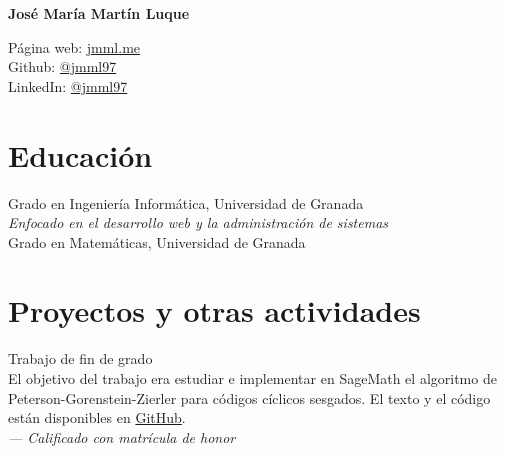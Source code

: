 \documentclass[11pt]{article} %
\begin{document}
\pagestyle{fancy}


{\LARGE\bfseries José María Martín Luque}
\bigskip\bigskip\medskip

\ifdefined\emailphone
  
\fi
Página web: \href{https://jmml.me}{jmml.me}\\
Github: \href{https://github.com/jmml97}{@jmml97}\\
LinkedIn: \href{https://linkedin.com/in/jmml97}{@jmml97}\\


\section*{Educación}

 Grado en Ingeniería Informática, Universidad de Granada\\
	{\color{gray}\itshape Enfocado en el desarrollo web y la administración de sistemas}\\

 Grado en Matemáticas, Universidad de Granada\\



\section*{Proyectos y otras actividades}

 Trabajo de fin de grado\\
{\color{gray}El objetivo del trabajo era estudiar e implementar en SageMath el algoritmo de Peterson-Gorenstein-Zierler para códigos cíclicos sesgados. El texto y el código están disponibles en \href{https://github.com/jmml97/tfg}{GitHub}.}\\
{\color{gray}\itshape — Calificado con matrícula de honor}\\
\end{document}
